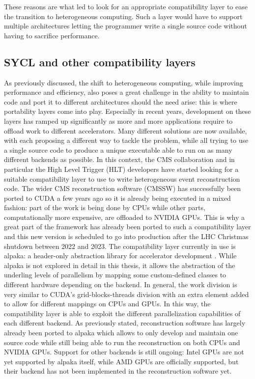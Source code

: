 These reasons are what led to look for an appropriate compatibility layer to ease the transition to heterogeneous computing. Such a layer would have to support multiple architectures letting the programmer write a single source code without having to sacrifice performance. 

\subsection{SYCL and other compatibility layers}
As previously discussed, the shift to heterogeneous computing, while improving performance and efficiency, also poses a great challenge in the ability to maintain code and port it to different architectures should the need arise: this is where portability layers come into play. Especially in recent years, development on these layers has ramped up significantly as more and more applications require to offload work to different accelerators. Many different solutions are now available, with each proposing a different way to tackle the problem, while all trying to use a single source code to produce a unique executable able to run on as many different backends as possible. In this context, the CMS collaboration and in particular the High Level Trigger (HLT) developers have started looking for a suitable compatibility layer to use to write heterogeneous event reconstruction code. The wider CMS reconstruction software (CMSSW) has successfully been ported to CUDA a few years ago so it is already being executed in a mixed fashion: part of the work is being done by CPUs while other parts, computationally more expensive, are offloaded to NVIDIA GPUs. This is why a great part of the framework has already been ported to such a compatibility layer and this new version is scheduled to go into production after the LHC Christmas shutdown between 2022 and 2023. The compatibility layer currently in use is alpaka: a header-only abstraction library for accelerator development \cite{alpaka}. While alpaka is not explored in detail in this thesis, it allows the abstraction of the underling levels of parallelism by mapping some custom-defined classes to different hardware depending on the backend. In general, the work division is very similar to CUDA's grid-blocks-threads division with an extra element added to allow for different mappings on CPUs and GPUs. In this way, the compatibility layer is able to exploit the different parallelization capabilities of each different backend. As previously stated, reconstruction software has largely already been ported to alpaka which allows to only develop and maintain one source code while still being able to run the reconstruction on both CPUs and NVIDIA GPUs. Support for other backends is still ongoing: Intel GPUs are not yet supported by alpaka itself, while AMD GPUs are officially supported, but their backend has not been implemented in the reconstruction software yet.

